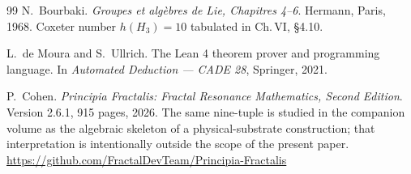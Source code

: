 \documentclass[11pt,a4paper]{amsart}
\theoremstyle{plain}
\theoremstyle{definition}
\begin{document}
\begin{thebibliography}{99}
N.~Bourbaki.
\newblock \emph{Groupes et alg\`ebres de Lie, Chapitres 4--6}.
\newblock Hermann, Paris, 1968.
\newblock Coxeter number $h(H_3) = 10$ tabulated in Ch.\,VI, \S 4.10.

L.~de Moura and S.~Ullrich.
\newblock The Lean 4 theorem prover and programming language.
\newblock In \emph{Automated Deduction --- CADE 28}, Springer, 2021.

P.~Cohen.
\newblock \emph{Principia Fractalis: Fractal Resonance Mathematics, Second Edition}.
\newblock Version 2.6.1, 915 pages, 2026.
\newblock The same nine-tuple is studied in the companion volume as the algebraic skeleton of a physical-substrate construction; that interpretation is intentionally outside the scope of the present paper.
\newblock \url{https://github.com/FractalDevTeam/Principia-Fractalis}

\end{thebibliography}
\end{document}
